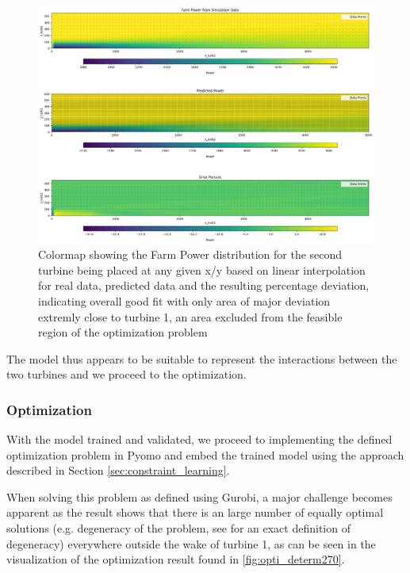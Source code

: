 \begin{figure}[h] 
	\centering
	\includegraphics[width=1\textwidth]{../figures/optimization/determ_model_colormap.png} 
	\caption{Colormap showing the Farm Power distribution for the second turbine being placed at any given x/y based on linear interpolation for real data, predicted data and the resulting percentage deviation, indicating overall good fit with only area of major deviation extremly close to turbine 1, an area excluded from the feasible region of the optimization problem }
	\label{fig:determ_model_colormap}
\end{figure}

The model thus appears to be suitable to represent the interactions between the two turbines and we proceed to the optimization.

\subsubsection{Optimization}


With the model trained and validated, we proceed to implementing the defined optimization problem in Pyomo  and embed the trained model using the approach described in Section \ref{sec:constraint_learning}.

When solving this problem as defined using Gurobi, a major challenge becomes apparent as the result shows that there is an large number of equally optimal solutions (e.g. degeneracy of the problem, see  \cite{vanderbei2020chapter3} for an exact definition of degeneracy) everywhere outside the wake of turbine 1, as can be seen  in the visualization of the optimization result found in \ref{fig:opti_determ270}.


